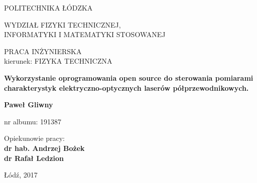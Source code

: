 \begin{titlepage}
 \begin{center}

  \vspace{0.5cm}
  \large{POLITECHNIKA ŁÓDZKA}

  \vspace{1cm}
  \normalsize{WYDZIAŁ FIZYKI TECHNICZNEJ, \\
  INFORMATYKI I MATEMATYKI STOSOWANEJ}

  \vspace{1.5cm}
  \large{PRACA INŻYNIERSKA \\kierunek: FIZYKA TECHNICZNA}

  \vspace{2cm}
  \Large\textbf{{Wykorzystanie oprogramowania open source do
    sterowania pomiarami charakterystyk
    elektryczno-optycznych laserów
    półprzewodnikowych.}}

  \vspace{2cm}
  \large\textbf{Paweł Gliwny}

  \large{nr albumu: 191387}

  \vspace{1cm}
  \begin{flushright}
  \large{Opiekunowie pracy:\\ \textbf{dr hab. Andrzej Bożek \\dr Rafał Ledzion}}
  \end{flushright}

  \vfill
  \normalsize{Łódź, 2017}
  \end{center}
\end{titlepage}